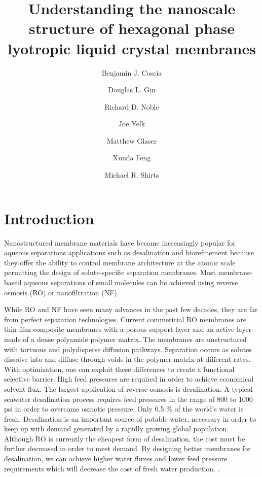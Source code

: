 \documentclass{article}
\title{Understanding the nanoscale structure of hexagonal phase
lyotropic liquid crystal membranes}
\author{Benjamin J. Coscia \and Douglas L. Gin \and Richard D. Noble
\and Joe Yelk \and Matthew Glaser \and Xunda Feng \and Michael R.
Shirts}
\begin{document}
  
  \graphicspath{{./figures/}}
  \maketitle

  \section*{Introduction}
  
  Nanostructured membrane materials have become increasingly popular for
  aqueous separations applications such as desalination and biorefinement because
  they offer the ability to control membrane architecture at the atomic scale
  permitting the design of solute-specific separation membranes.
  \cite{humplik_nanostructured_2011} Most membrane-based aqueous separations of
  small molecules can be achieved using reverse osmosis (RO) or nanofiltration
  (NF). \cite{van_der_bruggen_review_2003}

  While RO and NF have seen many advances in the past few decades, they are far
  from perfect separation technologies. Current commericial RO membranes are thin
  film composite membranes with a porous support layer and an active layer made
  of a dense polyamide polymer matrix.  The membranes are unstructured with
  tortuous and polydisperse diffusion pathways. Separation occurs as solutes
  dissolve into and diffuse through voids in the polymer matrix at different
  rates.\cite{wijmans_solution-diffusion_1995} With optimization, one can exploit
  these differences to create a functional selective barrier. High feed pressures
  are required in order to achieve economical solvent flux. The largest
  application of reverse osmosis is desalination. A typical seawater desalination
  process requires feed pressures in the range of 800 to 1000 psi in order to
  overcome osmotic pressure. \cite{fritzmann_state---art_2007} Only 0.5 \% of the
  world's water is fresh. Desalination is an important source of potable water,
  necessary in order to keep up with demand generated by a rapidly growing global
  population. Although RO is currently the cheapest form of desalination, the
  cost must be further decreased in order to meet demand. By designing better
  membranes for desalination, we can achieve higher water fluxes and lower feed
  pressure requirements which will decrease the cost of fresh water production.
  \cite{humplik_nanostructured_2011}.  

\end{document}
